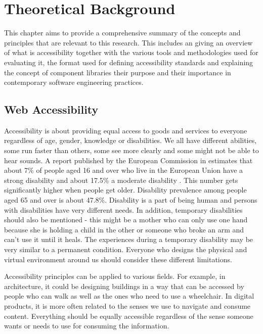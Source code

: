 \documentclass{master_thesis}
\begin{document}
\section{Theoretical Background}\label{chap:background}

This chapter aims to provide a comprehensive summary of the concepts and principles that are relevant to this research. This includes
an giving an overview of what is accessibility together with the various tools and methodologies used for evaluating it, the format used for defining accessibility standards and explaining the concept of component libraries their purpose and their importance in contemporary software engineering practices.

\subsection{Web Accessibility}

Accessibility is about providing equal access to goods and services to everyone regardless of age, gender, knowledge or disabilities. We all have different abilities, some run faster than others, some see more clearly and some might not be able to hear sounds. A report published by the European Commission in \citeyear{Grammenos2020} estimates that about 7\% of people aged 16 and over who live in the European Union have a strong disability and about 17.5\% a moderate disability \citep{Grammenos2020}. This number gets significantly higher when people get older. Disability prevalence among people aged 65 and over is about 47.8\%.  Disability is a part of being human and persons with disabilities have very different needs. In addition, temporary disabilities should also be mentioned - this might be a mother who can only use one hand because she is holding a child in the other or someone who broke an arm and can't use it until it heals. The experiences during a temporary disability may be very similar to a permanent condition. Everyone who designs the physical and virtual environment around us should consider these different limitations.

Accessibility principles can be applied to various fields. For example, in architecture, it could be designing buildings in a way that can be accessed by people who can walk as well as the ones who need to use a wheelchair. In digital products, it is more often related to the senses we use to navigate and consume content. Everything should be equally accessible regardless of the sense someone wants or needs to use for consuming the information.
\end{document}
